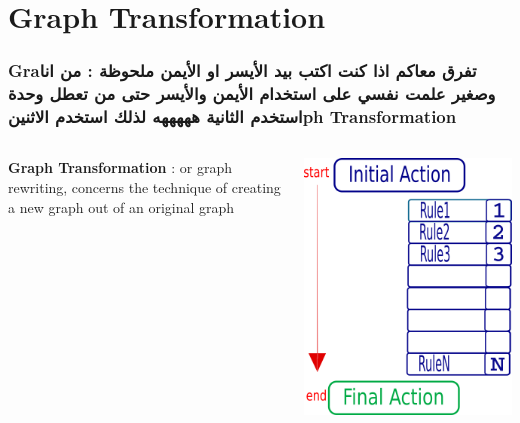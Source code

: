 \documentclass[12pt]{beamer}
\begin{document}
\section{Graph Transformation}
\begin{frame}
\frametitle{Graتفرق معاكم اذا كنت اكتب بيد الأيسر او الأيمن
ملحوظة : من انا وصغير علمت نفسي على استخدام الأيمن والأيسر حتى من تعطل وحدة استخدم الثانية هههههه لذلك استخدم الاثنينph Transformation} 

\begin{columns}
	
	 \begin{center}\textbf{Graph Transformation} :
	or graph rewriting, concerns the technique of creating a new graph out of an original graph
	\end{center}
	\includegraphics[scale=0.2]{gt.png}
	
\end{columns}

\end{frame}
\end{document}
